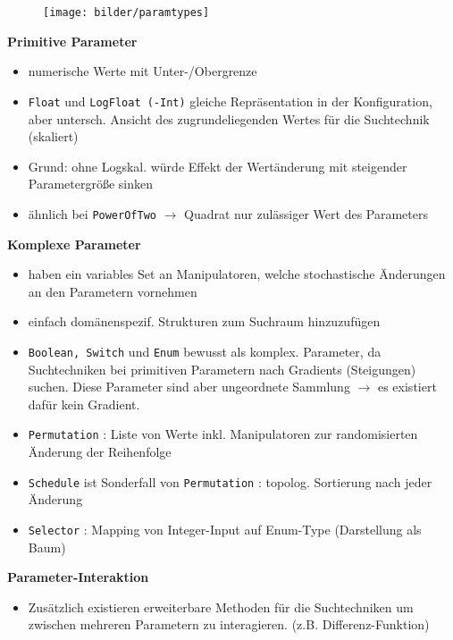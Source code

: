   \begin{frame}
      \begin{figure}[ht]
      \centering	      
      \texttt{[image: bilder/paramtypes]}
      \label{paramtypes}
    \end{figure}
    
  \textbf{Primitive Parameter}
  \begin{itemize}
    \item numerische Werte mit Unter-/Obergrenze
    \item \texttt{Float} und \texttt{LogFloat (-Int)} gleiche Repräsentation in der Konfiguration, aber 
    untersch. Ansicht des zugrundeliegenden Wertes für die Suchtechnik (skaliert)
    \item Grund: ohne Logskal. würde Effekt der Wertänderung mit steigender Parametergröße sinken
    \item ähnlich bei \texttt{PowerOfTwo} $\rightarrow$ Quadrat nur zulässiger Wert des Parameters
  \end{itemize}
  \end{frame}
  
  \begin{frame}
    \textbf{Komplexe Parameter}
    \begin{itemize}
      \item haben ein variables Set an Manipulatoren, welche stochastische Änderungen an den Parametern 
      vornehmen
      \item einfach domänenspezif. Strukturen zum Suchraum hinzuzufügen
      \item \texttt{Boolean, Switch} und \texttt{Enum} bewusst als komplex. Parameter, da Suchtechniken
      bei primitiven Parametern nach Gradients (Steigungen) suchen. Diese Parameter sind aber ungeordnete
      Sammlung $\rightarrow$ es existiert dafür kein Gradient.
      \item \texttt{Permutation} : Liste von Werte inkl. Manipulatoren zur randomisierten Änderung der Reihenfolge
      \item \texttt{Schedule} ist Sonderfall von \texttt{Permutation} : topolog. Sortierung nach jeder Änderung
      \item \texttt{Selector} : Mapping von Integer-Input auf Enum-Type (Darstellung als Baum)
    \end{itemize}
    
    \textbf{Parameter-Interaktion}
    \begin{itemize}
      \item Zusätzlich existieren erweiterbare Methoden für die Suchtechniken um zwischen mehreren Parametern 
    zu interagieren. (z.B. Differenz-Funktion)
    \end{itemize}
  \end{frame}
  
